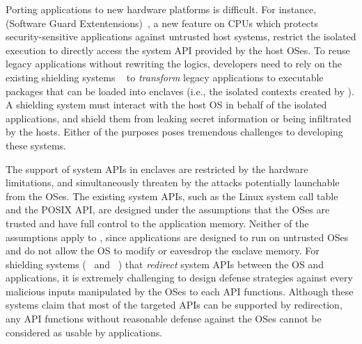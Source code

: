 Porting applications to new hardware platforms is difficult.
For instance, \intel{} \sgx{} (Software Guard Extentensions)~\cite{intel-sgx}, 
a new feature on \intel{} CPUs which
protects security-sensitive applications against untrusted host systems,
restrict the isolated execution to directly access the system API provided by the host OSes.
To reuse legacy applications without rewriting the logics,
developers need to rely on the existing \sgx{} shielding systems
~\cite{baumann14haven,osdi16scone,shinde17panoply}
to {\em transform} legacy applications to executable packages that can be loaded into enclaves
(i.e., the isolated contexts created by \sgx{}).
A \sgx{} shielding system must interact with the host OS in behalf of the isolated applications,
and shield them from leaking secret information or being infiltrated by the hosts.
Either of the purposes poses tremendous challenges to developing these systems.






 

The support of system APIs in enclaves are restricted by the \sgx{} hardware limitations, and simultaneously threaten by the attacks potentially launchable from the OSes.
The existing system APIs, such as the Linux system call table and the POSIX API,
are designed under the assumptions that the OSes are trusted and have full control to the application memory.
Neither of the assumptions apply to \sgx{}, since \sgx{} applications are designed to run on untrusted OSes and do not allow the OS to modify or eavesdrop the enclave memory. 
For shielding systems (\scone{}~\cite{osdi16scone} and \panoply{}~\cite{shinde17panoply}) that {\em redirect}
system APIs between the OS and applications,
it is extremely challenging to design defense strategies against
every malicious inputs manipulated by the OSes 
to each API functions.
Although these systems claim that most of the targeted APIs can be supported by redirection, any API functions without reasonable defense against the OSes cannot be considered as usable by applications.



